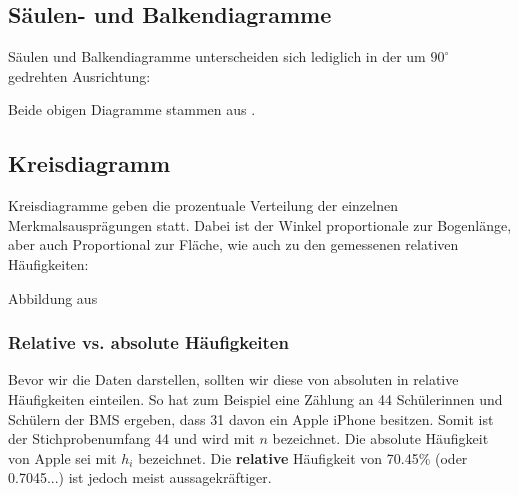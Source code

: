\subsection{Säulen- und
  Balkendiagramme}
Säulen und Balkendiagramme unterscheiden sich lediglich in der um $90^\circ$ gedrehten Ausrichtung:
\begin{center}
\end{center}
Beide obigen Diagramme stammen aus \cite{marthaler17}.

\subsection{Kreisdiagramm}
Kreisdiagramme geben die prozentuale Verteilung der einzelnen Merkmalsausprägungen statt. Dabei ist der Winkel proportionale zur Bogenlänge, aber auch Proportional zur Fläche, wie auch zu den gemessenen relativen Häufigkeiten:


Abbildung aus \cite{marthaler17}
\newpage

\subsubsection{Relative vs. absolute Häufigkeiten}

Bevor wir die Daten darstellen, sollten wir diese von absoluten in
relative Häufigkeiten einteilen. So hat zum Beispiel eine Zählung an
44 Schülerinnen und Schülern der BMS ergeben, dass 31 davon ein Apple
iPhone besitzen. Somit ist der Stichprobenumfang 44 und wird mit $n$
bezeichnet. Die absolute Häufigkeit von Apple sei mit $h_i$
bezeichnet. Die \textbf{relative} Häufigkeit von 70.45\% (oder 0.7045...) ist
jedoch meist aussagekräftiger.

